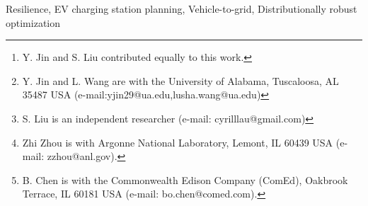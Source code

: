 \documentclass[journal]{IEEEtran}
\providecommand{\1}{\mathbf{1}}
\begin{document}
\author{Yuwei Jin, Shixin Liu, Zhi Zhou,~\selectfont\textit{Member,~IEEE,}
Bo Chen,~\selectfont\textit{Member,~IEEE,}
Lusha Wang,~\selectfont\textit{Member,~IEEE}
\thanks{Y. Jin and S. Liu contributed equally to this work.}
    \thanks{Y. Jin and L. Wang are with the University of Alabama, Tuscaloosa, AL 35487 USA (e-mail:{yjin29@ua.edu,lusha.wang}@ua.edu)}
      \thanks{S. Liu is an independent researcher (e-mail: {cyrilllau@gmail.com})}
      \thanks{Zhi Zhou is with Argonne National Laboratory, Lemont, IL 60439 USA (e-mail: zzhou@anl.gov).}
    \thanks{B. Chen is with the Commonwealth Edison Company (ComEd), Oakbrook Terrace, IL 60181 USA (e-mail: bo.chen@comed.com).}
      }
\maketitle
\begin{abstract}
The increasing frequency of extreme weather events has made resilience enhancement a critical concern for distribution networks. At the same time, the rapid deployment of electric vehicle charging stations (EVCSs) and the growing vehicle-to-grid (V2G) capability of electric vehicles (EVs) have created new opportunities for charging infrastructure to support not only daily charging demand but also post-disaster system recovery. This dual role makes EVCS planning important for both normal-operation economy and disaster resilience. To address this challenge, this paper proposes a unified two-stage hybrid distributionally robust optimization (DRO)–stochastic optimization framework for EVCS siting and sizing. In the proposed model, first-stage planning decisions are coordinated with second-stage recourse actions under both normal and disaster conditions. Heterogeneous uncertainty is explicitly modeled by combining sample-based stochastic representations of routine operational variability with distributionally robust outage uncertainty for extreme events. The resulting model is solved through a tractable reformulation and a decomposition-based solution algorithm. Case studies show that, compared with simplified planning approaches, the proposed framework achieves a better balance between economic efficiency and resilience, while improving post-disaster recovery performance.




\end{abstract}

\begin{IEEEkeywords}
Resilience, EV charging station planning, Vehicle-to-grid, Distributionally robust optimization
\end{IEEEkeywords}
\end{document}
